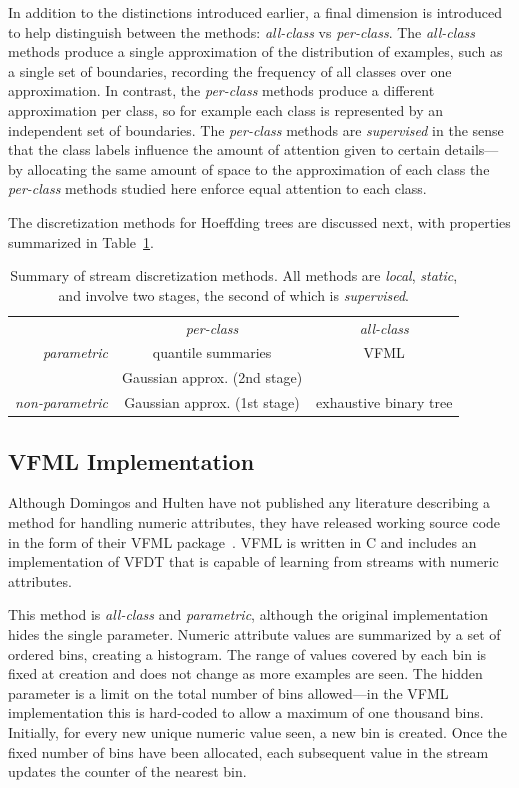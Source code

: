 In addition to the distinctions introduced earlier, a final dimension is introduced to help distinguish between the methods: {\em all-class} vs {\em per-class}. The {\em all-class} methods produce a single approximation of the distribution of examples, such as a single set of boundaries, recording the frequency of all classes over one approximation. In contrast, the {\em per-class} methods produce a different approximation per class, so for example each class is represented by an independent set of boundaries. The {\em per-class} methods are {\em supervised} in the sense that the class labels influence the amount of attention given to certain details---by allocating the same amount of space to the approximation of each class the {\em per-class} methods studied here enforce equal attention to each class.

The discretization methods for Hoeffding trees are discussed next, with properties summarized in Table~\ref{tab:streamdiscsummary}.

\begin{table}
\caption{Summary of stream discretization methods. All methods are {\em local}, {\em static}, and involve two stages, the second of which is {\em supervised}.}
\label{tab:streamdiscsummary}
\centering
\begin{tabular}{r|c|c|}
\multicolumn{1}{c}{} & \multicolumn{1}{c}{{\em per-class}} & \multicolumn{1}{c}{{\em all-class}} \\
\cline{2-3}
{\em parametric} & quantile summaries & VFML \\
 & Gaussian approx. (2nd stage) & \\
\cline{2-3}
{\em non-parametric} & Gaussian approx. (1st stage) & exhaustive binary tree \\
\cline{2-3}
\end{tabular}
\end{table}

\subsection{VFML Implementation}
\label{sec:vfmlnum}

Although Domingos and Hulten have not published any literature describing a method for handling numeric attributes, they have released working source code in the form of their VFML package~\cite{vfml}. VFML is written in C and includes an implementation of VFDT that is capable of learning from streams with numeric attributes.

This method is {\em all-class} and {\em parametric}, although the original implementation hides the single parameter. Numeric attribute values are summarized by a set of ordered bins, creating a histogram. The range of values covered by each bin is fixed at creation and does not change as more examples are seen. The hidden parameter is a limit on the total number of bins allowed---in the VFML implementation this is hard-coded to allow a maximum of one thousand bins. Initially, for every new unique numeric value seen, a new bin is created. Once the fixed number of bins have been allocated, each subsequent value in the stream updates the counter of the nearest bin.

